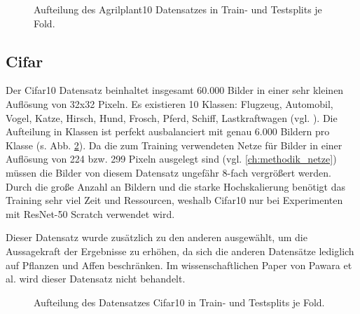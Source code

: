 \begin{figure}[H]
\begin{adjustbox}{width=1.1\textwidth, center}

\end{adjustbox}
\caption{Aufteilung des Agrilplant10 Datensatzes \cite{pawaraWebsiteDatensaetze} in Train- und Testsplits je Fold.}
\label{fig:Agrilplant10Zusammensetzung}
\end{figure}


\subsection{Cifar}
\label{ch:methodik_datensaetzeCifar10}
Der Cifar10 Datensatz beinhaltet insgesamt 60.000 Bilder in einer sehr kleinen Auflösung von 32x32 Pixeln. Es existieren 10 Klassen: Flugzeug, Automobil, Vogel, Katze, Hirsch, Hund, Frosch, Pferd, Schiff, Lastkraftwagen (vgl. \cite{cifar10}).
Die Aufteilung in Klassen ist perfekt ausbalanciert mit genau 6.000 Bildern pro Klasse (s. Abb. \ref{fig:Cifar10Zusammensetzung}).
Da die zum Training verwendeten Netze für Bilder in einer Auflösung von 224 bzw. 299 Pixeln ausgelegt sind (vgl. \ref{ch:methodik_netze}) müssen die Bilder von diesem Datensatz ungefähr 8-fach vergrößert werden.\\

Durch die große Anzahl an Bildern und die starke Hochskalierung benötigt das Training sehr viel Zeit und Ressourcen, weshalb Cifar10 nur bei Experimenten mit ResNet-50 Scratch verwendet wird.

Dieser Datensatz wurde zusätzlich zu den anderen ausgewählt, um die Aussagekraft der Ergebnisse zu erhöhen, da sich die anderen Datensätze lediglich auf Pflanzen und Affen beschränken. Im wissenschaftlichen Paper von Pawara et al. \cite{pawaraPaper} wird dieser Datensatz nicht behandelt.

\begin{figure}[H]
\begin{adjustbox}{width=1.4\textwidth, center}

\end{adjustbox}
\caption{Aufteilung des Datensatzes Cifar10 \cite{cifar10} in Train- und Testsplits je Fold.}
\label{fig:Cifar10Zusammensetzung}
\end{figure}


